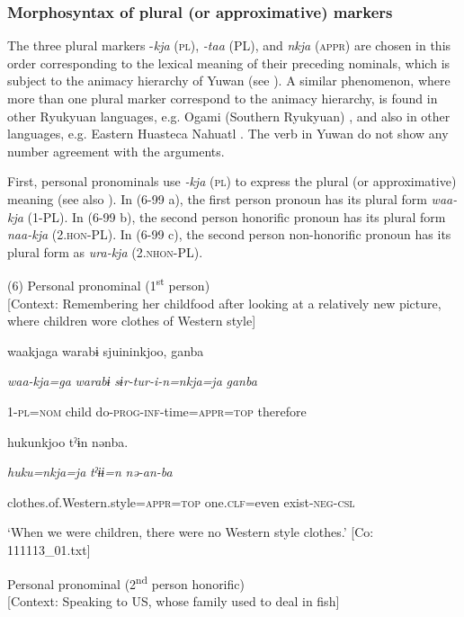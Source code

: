 \subsubsection{Morphosyntax of plural (or approximative) markers}

The three plural markers -\textit{kja} (\textsc{pl}), \textit{{}-taa} (PL), and \textit{nkja} (\textsc{appr}) are chosen in this order corresponding to the lexical meaning of their preceding nominals, which is subject to the animacy hierarchy of Yuwan (see ). A similar phenomenon, where more than one plural marker correspond to the animacy hierarchy, is found in other Ryukyuan languages, e.g. Ogami (Southern Ryukyuan) \citep[133]{Pellard2010}, and also in other languages, e.g. Eastern Huasteca Nahuatl \citep[77-78]{Corbett2000}. The verb in Yuwan do not show any number agreement with the arguments.

First, personal pronominals use \textit{{}-kja} (\textsc{pl}) to express the plural (or approximative) meaning (see also ). In (6-99 a), the first person pronoun has its plural form \textit{waa-kja} (1-PL). In (6-99 b), the second person honorific pronoun has its plural form \textit{naa-kja} (2.\textsc{hon}-PL). In (6-99 c), the second person non-honorific pronoun has its plural form as \textit{ura-kja} (2.\textsc{nhon}-PL).

(6) \ea Personal pronominal (1\textsuperscript{st} person)\\{}
[Context: Remembering her childfood after looking at a relatively new picture, where children wore clothes of Western style]

{\TM}
\gll waakjaga  warabɨ  sjuininkjoo,  ganba

      \textit{waa-kja=ga}  \textit{warabɨ}  \textit{sɨr-tur-i-n=nkja=ja}  \textit{ganba}

      1-\textsc{pl}=\textsc{nom}  child  do-\textsc{prog}-\textsc{inf}-time=\textsc{appr}=\textsc{top}  therefore

      hukunkjoo  tˀɨn  nənba.

      \textit{huku=nkja=ja}  \textit{tˀɨɨ=n}  \textit{nə-an-ba}

      clothes.of.Western.style=\textsc{appr}=\textsc{top}  one.\textsc{clf}=even  exist-\textsc{neg}-\textsc{csl}

\glt ‘When we were children, there were no Western style clothes.’ [Co: 111113\_01.txt]
\z

 \ex Personal pronominal (2\textsuperscript{nd} person honorific)\\{}
[Context: Speaking to US, whose family used to deal in fish]

